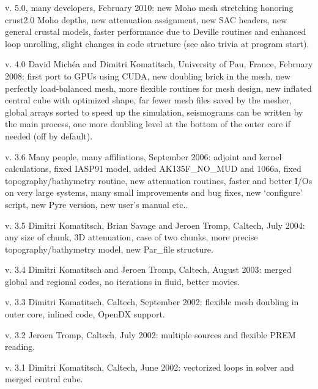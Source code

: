  v. 5.0, many developers, February 2010:
     new Moho mesh stretching honoring crust2.0 Moho depths,
     new attenuation assignment, new SAC headers, new general crustal models,
     faster performance due to Deville routines and enhanced loop unrolling,
     slight changes in code structure (see also trivia at program start).\newline

 v. 4.0 David Mich\'ea and Dimitri Komatitsch, University of Pau, France, February 2008:
      first port to GPUs using CUDA, new doubling brick in the mesh, new perfectly load-balanced mesh,
      more flexible routines for mesh design, new inflated central cube
      with optimized shape, far fewer mesh files saved by the mesher,
      global arrays sorted to speed up the simulation, seismograms can be
      written by the main process, one more doubling level at the bottom
      of the outer core if needed (off by default).\newline

 v. 3.6 Many people, many affiliations, September 2006:
      adjoint and kernel calculations, fixed IASP91 model,
      added AK135F\_NO\_MUD and 1066a, fixed topography/bathymetry routine,
      new attenuation routines, faster and better I/Os on very large
      systems, many small improvements and bug fixes, new `configure'
      script, new Pyre version, new user's manual etc..\newline

 v. 3.5 Dimitri Komatitsch, Brian Savage and Jeroen Tromp, Caltech, July 2004:
      any size of chunk, 3D attenuation, case of two chunks,
      more precise topography/bathymetry model, new Par\_file structure.\newline

 v. 3.4 Dimitri Komatitsch and Jeroen Tromp, Caltech, August 2003:
      merged global and regional codes, no iterations in fluid, better movies.\newline

 v. 3.3 Dimitri Komatitsch, Caltech, September 2002:
      flexible mesh doubling in outer core, inlined code, OpenDX support.\newline

 v. 3.2 Jeroen Tromp, Caltech, July 2002:
      multiple sources and flexible PREM reading.\newline

 v. 3.1 Dimitri Komatitsch, Caltech, June 2002:
      vectorized loops in solver and merged central cube.\newline

